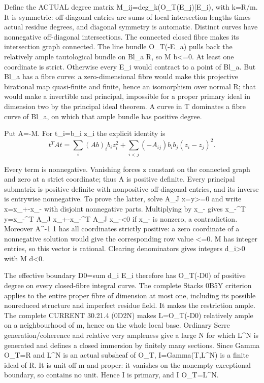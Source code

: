 \documentclass[11pt]{article}
\begin{document}
Define the ACTUAL degree matrix M\_ij=deg\_k(O\_T(E\_j)|E\_i), with k=R/m. It is symmetric: off-diagonal entries are sums of local intersection lengths times actual residue degrees, and diagonal symmetry is automatic. Distinct curves have nonnegative off-diagonal intersections. The connected closed fibre makes its intersection graph connected. The line bundle O\_T(-E\_a) pulls back the relatively ample tautological bundle on Bl\_a R, so M b<=0. At least one coordinate is strict. Otherwise every E\_i would contract to a point of Bl\_a. But Bl\_a has a fibre curve: a zero-dimensional fibre would make this projective birational map quasi-finite and finite, hence an isomorphism over normal R; that would make a invertible and principal, impossible for a proper primary ideal in dimension two by the principal ideal theorem. A curve in T dominates a fibre curve of Bl\_a, on which that ample bundle has positive degree.

Put A=-M. For t\_i=b\_i z\_i the explicit identity is
\[
t^T A t=\sum_i (A b)_i b_i z_i^2+
\sum_{i<j}(-A_{ij})b_i b_j(z_i-z_j)^2.
\]

Every term is nonnegative. Vanishing forces z constant on the connected graph and zero at a strict coordinate; thus A is positive definite. Every principal submatrix is positive definite with nonpositive off-diagonal entries, and its inverse is entrywise nonnegative. To prove the latter, solve A\_J x=y>=0 and write x=x\_+-x\_- with disjoint nonnegative parts. Multiplying by x\_- gives x\_-\textasciicircum{}T y=x\_-\textasciicircum{}T A\_J x\_+-x\_-\textasciicircum{}T A\_J x\_-<0 if x\_- is nonzero, a contradiction. Moreover A\textasciicircum{}-1 1 has all coordinates strictly positive: a zero coordinate of a nonnegative solution would give the corresponding row value <=0. M has integer entries, so this vector is rational. Clearing denominators gives integers d\_i>0 with M d<0.

The effective boundary D0=sum d\_i E\_i therefore has O\_T(-D0) of positive degree on every closed-fibre integral curve. The complete Stacks 0B5Y criterion applies to the entire proper fibre of dimension at most one, including its possible nonreduced structure and imperfect residue field. It makes the restriction ample. The complete CURRENT 30.21.4 (0D2N) makes L=O\_T(-D0) relatively ample on a neighbourhood of m, hence on the whole local base. Ordinary Serre generation/coherence and relative very ampleness give a large N for which L\textasciicircum{}N is generated and defines a closed immersion by finitely many sections. Since Gamma O\_T=R and L\textasciicircum{}N is an actual subsheaf of O\_T, I=Gamma(T,L\textasciicircum{}N) is a finite ideal of R. It is unit off m and proper: it vanishes on the nonempty exceptional boundary, so contains no unit. Hence I is primary, and I O\_T=L\textasciicircum{}N.
\end{document}
